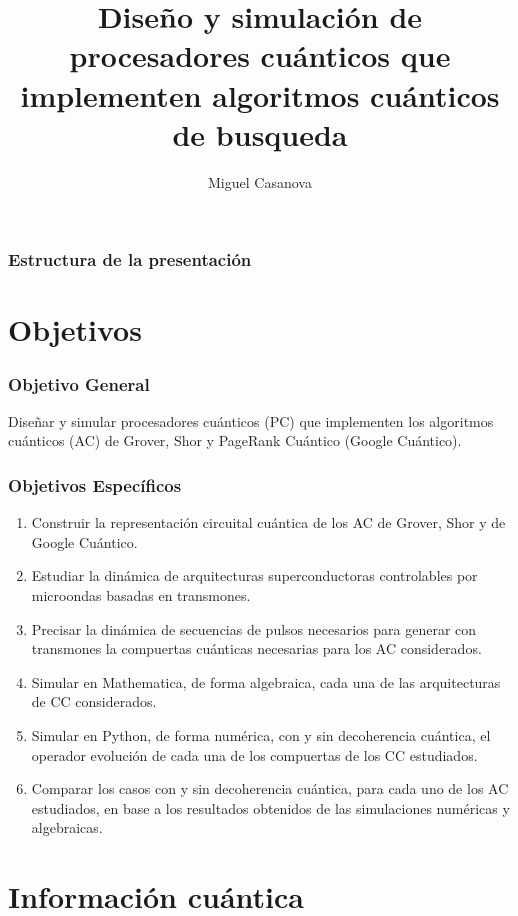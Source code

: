 \documentclass[xetex,mathserif,serif, 8pt]{beamer}
\title[Simulación de procesadores cuánticos] %
{Diseño y simulación de procesadores cuánticos que implementen algoritmos cuánticos de busqueda}
\author[M. Casanova] %
{Miguel Casanova}
\institute[Universidad Simón Bolívar] %
{
  Coordinación de Tecnología e Ingeniería Electrónica\\
  Universidad Simón Bolívar
}
\begin{document}
\frame{\titlepage}

\begin{frame}
\frametitle{Estructura de la presentación}
\tableofcontents
\end{frame}

\section{Objetivos}
\begin{frame}
    \frametitle{Objetivo General}

    Diseñar y simular procesadores cuánticos (PC) que implementen los algoritmos cuánticos (AC) de Grover, Shor y PageRank Cuántico (Google Cuántico).

\end{frame}

\begin{frame}
    \frametitle{Objetivos Específicos}

    \begin{enumerate}
        \item Construir la representación circuital cuántica de los AC de Grover, Shor y de Google Cuántico.
        \item Estudiar la dinámica de arquitecturas superconductoras controlables por microondas basadas en transmones.
        \item Precisar la dinámica de secuencias de pulsos necesarios para generar con transmones la compuertas cuánticas necesarias para los AC considerados.
        \item Simular en Mathematica, de forma algebraica, cada una de las arquitecturas de CC considerados.
        \item Simular en Python, de forma numérica, con y sin decoherencia cuántica, el operador evolución de cada una de los compuertas de los CC estudiados.
        \item Comparar los casos con y sin decoherencia cuántica, para cada uno de los AC estudiados, en base a los resultados obtenidos de las simulaciones numéricas y algebraicas.
    \end{enumerate}

\end{frame}

\section{Información cuántica}
\end{document}

